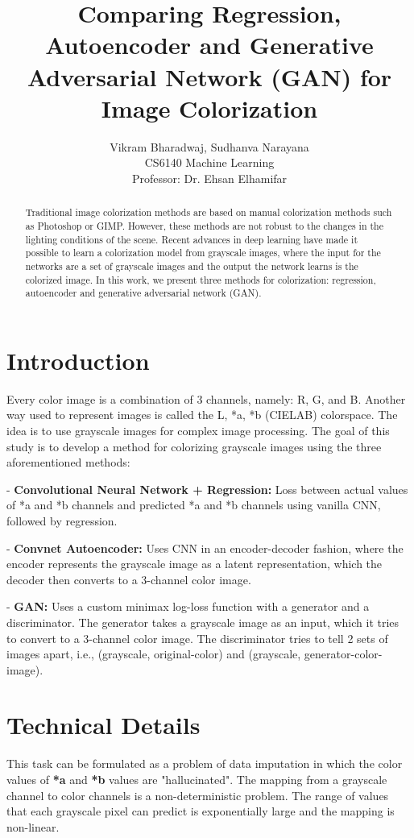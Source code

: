 \documentclass{article}
\title{Comparing Regression, Autoencoder and Generative
Adversarial Network (GAN) for Image Colorization}
\author{Vikram Bharadwaj, Sudhanva Narayana \\ 
        CS6140 Machine Learning \\
        Professor: Dr. Ehsan Elhamifar \\}
\begin{document}
\maketitle

\begin{abstract}
Traditional image colorization methods are based on manual colorization methods such as Photoshop or GIMP.
However, these methods are not robust to the changes in the lighting conditions of the scene.
Recent advances in deep learning have made it possible to learn a colorization model from grayscale images, where the input for the networks are a set of grayscale images and the output the network learns is the colorized image. 
In this work, we present three methods for colorization: regression, autoencoder and generative adversarial network (GAN).
\end{abstract}

\section{Introduction}
Every color image is a combination of 3 channels, namely: R, G, and B. 
Another way used to represent images is called the L, *a, *b (CIELAB) colorspace.
The idea is to use grayscale images for complex image processing. 
The goal of this study is to develop a method for colorizing grayscale images using the three aforementioned methods:

- \textbf{Convolutional Neural Network + Regression:} Loss between actual values of *a and *b channels and predicted *a and *b channels using vanilla CNN, followed by regression.

- \textbf{Convnet Autoencoder:} Uses CNN in an encoder-decoder fashion, where the encoder represents the grayscale image as a latent representation, which the decoder then converts to a 3-channel color image.

- \textbf{GAN:}  Uses a custom minimax log-loss function with a generator and a discriminator. The generator takes a grayscale image as an input, which it tries to convert to a 3-channel color image. The discriminator tries to tell 2 sets of images apart, i.e., (grayscale, original-color) and (grayscale, generator-color-image).

\section{Technical Details}
This task can be formulated as a problem of data imputation in which the color values of \textbf{*a} and \textbf{*b} values are "hallucinated".
The mapping from a grayscale channel to color channels is a non-deterministic problem. 
The range of values that each grayscale pixel can predict is exponentially large and the mapping is non-linear. 
\end{document}
